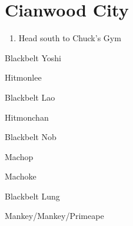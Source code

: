 \chapter{Cianwood City}
\vspace{0.5mm}

\begin{paracol}{2}
\begin{enumerate}
	\item Head south to Chuck's Gym
\end{enumerate}

\begin{trainer}{Blackbelt Yoshi}
	\varwb
	\begin{fightSection}{Hitmonlee}
		\item {} \headbutt
		\item {} \strength
	\end{fightSection}
	\varwe
\end{trainer}

\begin{trainer}{Blackbelt Lao}
	\varwb
	\begin{fightSection}{Hitmonchan}
		\item {} \headbutt
		\item {} \strength
	\end{fightSection}
	\varwe
\end{trainer}

\begin{trainer}{Blackbelt Nob}
	\varwb
	\begin{fightSection}{Machop}
		\item {} \surf
	\end{fightSection}
	\begin{fightSection}{Machoke}
		\item {} \strength{} 
	\end{fightSection}
	\varwe
\end{trainer}

\begin{trainer}{Blackbelt Lung}
	\varwb
	\begin{fightSection}{Mankey/Mankey/Primeape}
		\item {} \strength{} 
	\end{fightSection}
	\varwe
\end{trainer}


\end{paracol}
